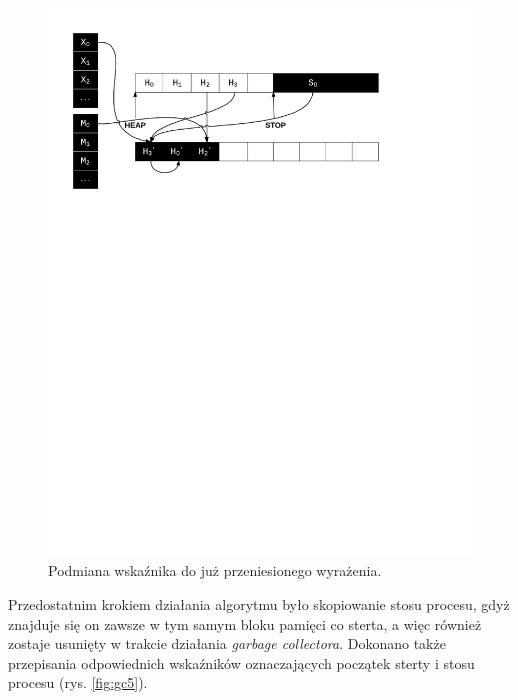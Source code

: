 \begin{figure}[h]
\centerline{\includegraphics[scale=0.75, clip, trim=10mm 185mm 45mm 10mm]{gc_4}}
\caption{Podmiana wskaźnika do już przeniesionego wyrażenia.}
\label{fig:gc4}
\end{figure}

Przedostatnim krokiem działania algorytmu było skopiowanie stosu procesu, gdyż znajduje się on zawsze w tym samym bloku pamięci co sterta, a więc również zostaje usunięty w trakcie działania \emph{garbage collectora}.
Dokonano także przepisania odpowiednich wskaźników oznaczających początek sterty i stosu procesu (rys. \ref{fig:gc5}).

